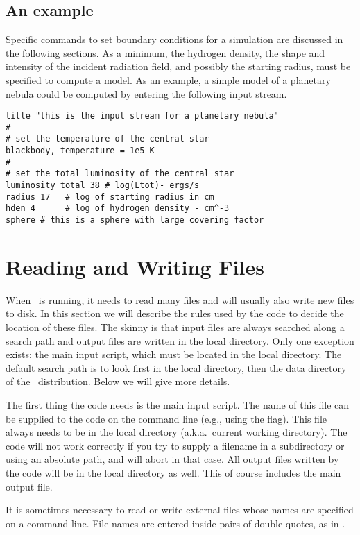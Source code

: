 \subsection{An example}

Specific commands to set boundary conditions for a simulation are
discussed in the following sections.
As a minimum, the hydrogen density,
the shape and intensity of the incident radiation field,
and possibly the starting radius, must be specified to compute a model.
As an example, a simple model
of a planetary nebula could be computed by entering
the following input stream.
\begin{verbatim}
title "this is the input stream for a planetary nebula"
#
# set the temperature of the central star
blackbody, temperature = 1e5 K
#
# set the total luminosity of the central star
luminosity total 38 # log(Ltot)- ergs/s
radius 17   # log of starting radius in cm
hden 4      # log of hydrogen density - cm^-3
sphere # this is a sphere with large covering factor
\end{verbatim}

\section{Reading and Writing Files}
\label{sec:ReadingWritingFiles}

When \Cloudy\ is running, it needs to read many files and will usually also
write new files to disk. In this section we will describe the rules used by
the code to decide the location of these files. The skinny is that input files
are always searched along a search path and output files are written in the
local directory. Only one exception exists: the main input script, which must
be located in the local directory. The default search path is to look first in
the local directory, then the data directory of the \Cloudy\ distribution.
Below we will give more details.

The first thing the code needs is the main input script. The name of this file
can be supplied to the code on the command line (e.g., using the
 flag). This file always needs to be in the local directory
(a.k.a.\ current working directory). The code will not work correctly if you
try to supply a filename in a subdirectory or using an absolute path, and will
abort in that case. All output files written by the code will be in the local
directory as well. This of course includes the main output file.

It is sometimes necessary to read or write external files whose names
are specified on a command line.  File names are entered inside pairs of
double quotes, as in .

